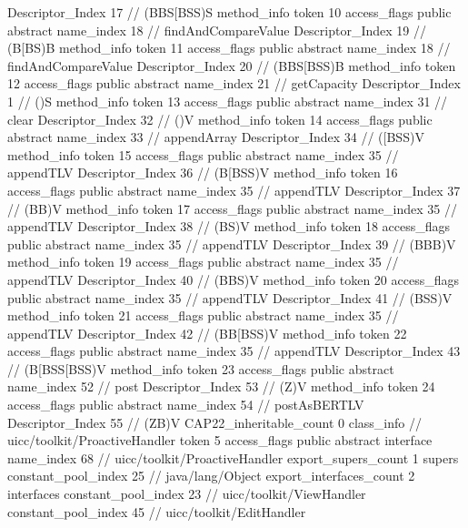 {{{{{					Descriptor_Index	17		// (BBS[BSS)S
				}
				method_info {
					token	10
					access_flags	public abstract
					name_index	18		// findAndCompareValue
					Descriptor_Index	19		// (B[BS)B
				}
				method_info {
					token	11
					access_flags	public abstract
					name_index	18		// findAndCompareValue
					Descriptor_Index	20		// (BBS[BSS)B
				}
				method_info {
					token	12
					access_flags	public abstract
					name_index	21		// getCapacity
					Descriptor_Index	1		// ()S
				}
				method_info {
					token	13
					access_flags	public abstract
					name_index	31		// clear
					Descriptor_Index	32		// ()V
				}
				method_info {
					token	14
					access_flags	public abstract
					name_index	33		// appendArray
					Descriptor_Index	34		// ([BSS)V
				}
				method_info {
					token	15
					access_flags	public abstract
					name_index	35		// appendTLV
					Descriptor_Index	36		// (B[BSS)V
				}
				method_info {
					token	16
					access_flags	public abstract
					name_index	35		// appendTLV
					Descriptor_Index	37		// (BB)V
				}
				method_info {
					token	17
					access_flags	public abstract
					name_index	35		// appendTLV
					Descriptor_Index	38		// (BS)V
				}
				method_info {
					token	18
					access_flags	public abstract
					name_index	35		// appendTLV
					Descriptor_Index	39		// (BBB)V
				}
				method_info {
					token	19
					access_flags	public abstract
					name_index	35		// appendTLV
					Descriptor_Index	40		// (BBS)V
				}
				method_info {
					token	20
					access_flags	public abstract
					name_index	35		// appendTLV
					Descriptor_Index	41		// (BSS)V
				}
				method_info {
					token	21
					access_flags	public abstract
					name_index	35		// appendTLV
					Descriptor_Index	42		// (BB[BSS)V
				}
				method_info {
					token	22
					access_flags	public abstract
					name_index	35		// appendTLV
					Descriptor_Index	43		// (B[BSS[BSS)V
				}
				method_info {
					token	23
					access_flags	public abstract
					name_index	52		// post
					Descriptor_Index	53		// (Z)V
				}
				method_info {
					token	24
					access_flags	public abstract
					name_index	54		// postAsBERTLV
					Descriptor_Index	55		// (ZB)V
				}
			}
			CAP22_inheritable_count	0
		}
		class_info {		// uicc/toolkit/ProactiveHandler
			token	5
			access_flags	public abstract interface
			name_index	68		// uicc/toolkit/ProactiveHandler
			export_supers_count	1
			supers {
				constant_pool_index	25		// java/lang/Object
			}
			export_interfaces_count	2
			interfaces {
				constant_pool_index	23		// uicc/toolkit/ViewHandler
				constant_pool_index	45		// uicc/toolkit/EditHandler
}}}}
